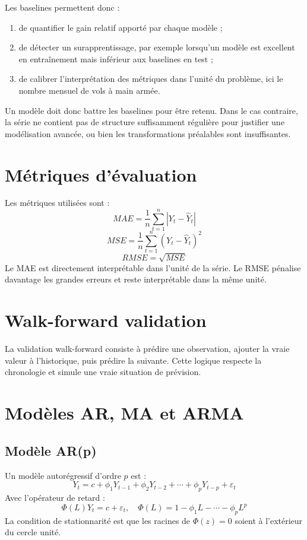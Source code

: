 \documentclass[12pt,a4paper]{report}
\begin{document}
Les baselines permettent donc :
\begin{enumerate}
    \item de quantifier le gain relatif apporté par chaque modèle ;
    \item de détecter un surapprentissage, par exemple lorsqu'un modèle est excellent en entraînement mais inférieur aux baselines en test ;
    \item de calibrer l'interprétation des métriques dans l'unité du problème, ici le nombre mensuel de vols à main armée.
\end{enumerate}

Un modèle doit donc battre les baselines pour être retenu. Dans le cas contraire, la série ne contient pas de structure suffisamment régulière pour justifier une modélisation avancée, ou bien les transformations préalables sont insuffisantes.

\section{Métriques d'évaluation}
Les métriques utilisées sont :
\[
MAE = \frac{1}{n}\sum_{t=1}^n |Y_t - \hat{Y}_t|
\]
\[
MSE = \frac{1}{n}\sum_{t=1}^n (Y_t - \hat{Y}_t)^2
\]
\[
RMSE = \sqrt{MSE}
\]
Le MAE est directement interprétable dans l'unité de la série. Le RMSE pénalise davantage les grandes erreurs et reste interprétable dans la même unité.

\section{Walk-forward validation}
La validation walk-forward consiste à prédire une observation, ajouter la vraie valeur à l'historique, puis prédire la suivante. Cette logique respecte la chronologie et simule une vraie situation de prévision.

\section{Modèles AR, MA et ARMA}
\subsection{Modèle AR(p)}
Un modèle autorégressif d'ordre $p$ est :
\[
Y_t = c + \phi_1Y_{t-1} + \phi_2Y_{t-2} + \cdots + \phi_pY_{t-p} + \varepsilon_t
\]
Avec l'opérateur de retard :
\[
\Phi(L)Y_t = c + \varepsilon_t, \quad \Phi(L)=1-\phi_1L-\cdots-\phi_pL^p
\]
La condition de stationnarité est que les racines de $\Phi(z)=0$ soient à l'extérieur du cercle unité.
\end{document}
